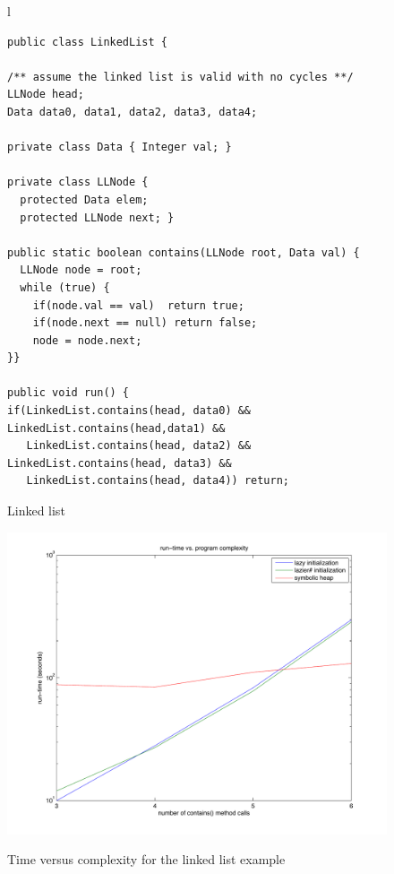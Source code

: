 \begin{figure}
\begin{tabular}[c]{l}
\begin{lstlisting}
public class LinkedList {

/** assume the linked list is valid with no cycles **/
LLNode head;
Data data0, data1, data2, data3, data4;

private class Data { Integer val; }

private class LLNode {
  protected Data elem;
  protected LLNode next; }

public static boolean contains(LLNode root, Data val) {
  LLNode node = root;
  while (true) {
    if(node.val == val)  return true;
    if(node.next == null) return false;
    node = node.next;
}}

public void run() {
if(LinkedList.contains(head, data0) && LinkedList.contains(head,data1) &&
   LinkedList.contains(head, data2) && LinkedList.contains(head, data3) &&
   LinkedList.contains(head, data4)) return;
\end{lstlisting}
\end{tabular} 
\caption{Linked list}
\label{fig:example}
\end{figure}

\begin{figure}[htb]
\scalebox{0.45}
{\includegraphics[width=563px]{../figs/time_vs_complexity.pdf}}
\caption{Time versus complexity for the linked list example}
\label{fig:tvc}
\end{figure}

